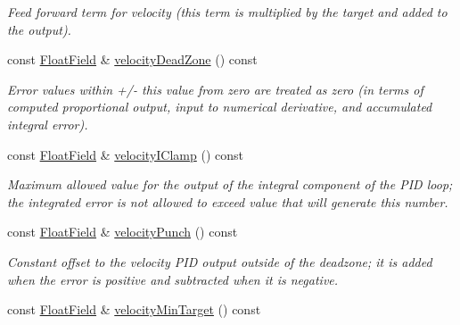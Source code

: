 \begin{DoxyCompactItemize}
\begin{DoxyCompactList}\small\item\em Feed forward term for velocity (this term is multiplied by the target and added to the output). \end{DoxyCompactList}\item 
const \hyperlink{classhebi_1_1Info_1_1FloatField}{Float\+Field} \& \hyperlink{classhebi_1_1Info_1_1Settings_1_1Actuator_1_1VelocityGains_abf91a6e5f99324d0e329834f86bac039}{velocity\+Dead\+Zone} () const \hypertarget{classhebi_1_1Info_1_1Settings_1_1Actuator_1_1VelocityGains_abf91a6e5f99324d0e329834f86bac039}{}\label{classhebi_1_1Info_1_1Settings_1_1Actuator_1_1VelocityGains_abf91a6e5f99324d0e329834f86bac039}

\begin{DoxyCompactList}\small\item\em Error values within +/-\/ this value from zero are treated as zero (in terms of computed proportional output, input to numerical derivative, and accumulated integral error). \end{DoxyCompactList}\item 
const \hyperlink{classhebi_1_1Info_1_1FloatField}{Float\+Field} \& \hyperlink{classhebi_1_1Info_1_1Settings_1_1Actuator_1_1VelocityGains_a9152d0a51ea8b338943a6886e75f7a23}{velocity\+I\+Clamp} () const \hypertarget{classhebi_1_1Info_1_1Settings_1_1Actuator_1_1VelocityGains_a9152d0a51ea8b338943a6886e75f7a23}{}\label{classhebi_1_1Info_1_1Settings_1_1Actuator_1_1VelocityGains_a9152d0a51ea8b338943a6886e75f7a23}

\begin{DoxyCompactList}\small\item\em Maximum allowed value for the output of the integral component of the P\+ID loop; the integrated error is not allowed to exceed value that will generate this number. \end{DoxyCompactList}\item 
const \hyperlink{classhebi_1_1Info_1_1FloatField}{Float\+Field} \& \hyperlink{classhebi_1_1Info_1_1Settings_1_1Actuator_1_1VelocityGains_a22253a114fecc7985bd771fb9b4e905c}{velocity\+Punch} () const \hypertarget{classhebi_1_1Info_1_1Settings_1_1Actuator_1_1VelocityGains_a22253a114fecc7985bd771fb9b4e905c}{}\label{classhebi_1_1Info_1_1Settings_1_1Actuator_1_1VelocityGains_a22253a114fecc7985bd771fb9b4e905c}

\begin{DoxyCompactList}\small\item\em Constant offset to the velocity P\+ID output outside of the deadzone; it is added when the error is positive and subtracted when it is negative. \end{DoxyCompactList}\item 
const \hyperlink{classhebi_1_1Info_1_1FloatField}{Float\+Field} \& \hyperlink{classhebi_1_1Info_1_1Settings_1_1Actuator_1_1VelocityGains_a708f0c72f0b1b2269d9c648b7b2d6c89}{velocity\+Min\+Target} () const \hypertarget{classhebi_1_1Info_1_1Settings_1_1Actuator_1_1VelocityGains_a708f0c72f0b1b2269d9c648b7b2d6c89}{}\label{classhebi_1_1Info_1_1Settings_1_1Actuator_1_1VelocityGains_a708f0c72f0b1b2269d9c648b7b2d6c89}


\end{DoxyCompactItemize}
